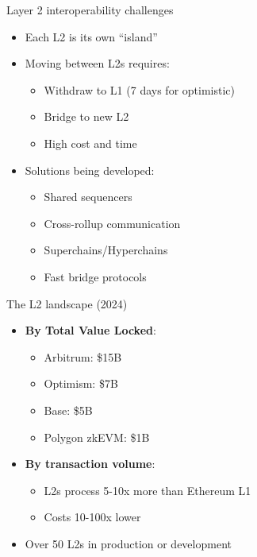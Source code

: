 \documentclass[aspectratio=169, lualatex, handout]{beamer}
\begin{document}
\begin{frame}{Layer 2 interoperability challenges}
	\begin{itemize}
		\item Each L2 is its own ``island''
		\item Moving between L2s requires:
		      \begin{itemize}
			      \item Withdraw to L1 (7 days for optimistic)
			      \item Bridge to new L2
			      \item High cost and time
		      \end{itemize}
		\item Solutions being developed:
		      \begin{itemize}
			      \item Shared sequencers
			      \item Cross-rollup communication
			      \item Superchains/Hyperchains
			      \item Fast bridge protocols
		      \end{itemize}
	\end{itemize}
\end{frame}

\begin{frame}{The L2 landscape (2024)}
	\begin{itemize}
		\item \textbf{By Total Value Locked}:
		      \begin{itemize}
			      \item Arbitrum: \approx\$15B
			      \item Optimism: \approx\$7B
			      \item Base: \approx\$5B
			      \item Polygon zkEVM: \approx\$1B
		      \end{itemize}
		\item \textbf{By transaction volume}:
		      \begin{itemize}
			      \item L2s process 5-10x more than Ethereum L1
			      \item Costs 10-100x lower
		      \end{itemize}
		\item Over 50 L2s in production or development
	\end{itemize}
\end{frame}
\end{document}

